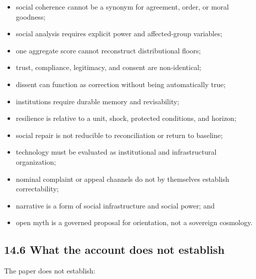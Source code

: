 \documentclass[
  11pt,
]{article}
\providecommand{\tightlist}{%
  \setlength{\itemsep}{0pt}\setlength{\parskip}{0pt}}
\begin{document}
\begin{itemize}
\tightlist
\item
  social coherence cannot be a synonym for agreement, order, or moral
  goodness;
\item
  social analysis requires explicit power and affected-group variables;
\item
  one aggregate score cannot reconstruct distributional floors;
\item
  trust, compliance, legitimacy, and consent are non-identical;
\item
  dissent can function as correction without being automatically true;
\item
  institutions require durable memory and revisability;
\item
  resilience is relative to a unit, shock, protected conditions, and
  horizon;
\item
  social repair is not reducible to reconciliation or return to
  baseline;
\item
  technology must be evaluated as institutional and infrastructural
  organization;
\item
  nominal complaint or appeal channels do not by themselves establish
  correctability;
\item
  narrative is a form of social infrastructure and social power; and
\item
  open myth is a governed proposal for orientation, not a sovereign
  cosmology.
\end{itemize}

\subsection{14.6 What the account does not
establish}\label{what-the-account-does-not-establish}

The paper does not establish:
\end{document}
